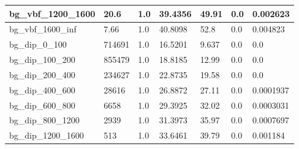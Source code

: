\documentclass[a4paper, 10pt]{article}
\begin{document}
\begin{table}[H]
\begin{center}
\begin{tabular}{|m{23.0mm}|m{23.0mm}|m{18.0mm}|m{19.0mm}|m{19.0mm}|m{19.0mm}|m{19.0mm}|}
      \hline
      {\cellcolor{white}         bg\_vbf\_1200\_1600}& {\cellcolor{white}         20.6}& {\cellcolor{white}         1.0}& {\cellcolor{white}         39.4356}& {\cellcolor{white}         49.91}& {\cellcolor{green}         0.0}& {\cellcolor{green}         0.002623}\\
      \hline
      {\cellcolor{white}         bg\_vbf\_1600\_inf}& {\cellcolor{white}         7.66}& {\cellcolor{white}         1.0}& {\cellcolor{white}         40.8098}& {\cellcolor{white}         52.8}& {\cellcolor{green}         0.0}& {\cellcolor{green}         0.004823}\\
      \hline
      {\cellcolor{white}         bg\_dip\_0\_100}& {\cellcolor{white}         714691}& {\cellcolor{white}         1.0}& {\cellcolor{white}         16.5201}& {\cellcolor{white}         9.637}& {\cellcolor{green}         0.0}& {\cellcolor{green}         0.0}\\
      \hline
      {\cellcolor{white}         bg\_dip\_100\_200}& {\cellcolor{white}         855479}& {\cellcolor{white}         1.0}& {\cellcolor{white}         18.8185}& {\cellcolor{white}         12.99}& {\cellcolor{green}         0.0}& {\cellcolor{green}         0.0}\\
      \hline
      {\cellcolor{white}         bg\_dip\_200\_400}& {\cellcolor{white}         234627}& {\cellcolor{white}         1.0}& {\cellcolor{white}         22.8735}& {\cellcolor{white}         19.58}& {\cellcolor{green}         0.0}& {\cellcolor{green}         0.0}\\
      \hline
      {\cellcolor{white}         bg\_dip\_400\_600}& {\cellcolor{white}         28616}& {\cellcolor{white}         1.0}& {\cellcolor{white}         26.8872}& {\cellcolor{white}         27.11}& {\cellcolor{green}         0.0}& {\cellcolor{green}         0.0001937}\\
      \hline
      {\cellcolor{white}         bg\_dip\_600\_800}& {\cellcolor{white}         6658}& {\cellcolor{white}         1.0}& {\cellcolor{white}         29.3925}& {\cellcolor{white}         32.02}& {\cellcolor{green}         0.0}& {\cellcolor{green}         0.0003031}\\
      \hline
      {\cellcolor{white}         bg\_dip\_800\_1200}& {\cellcolor{white}         2939}& {\cellcolor{white}         1.0}& {\cellcolor{white}         31.3973}& {\cellcolor{white}         35.97}& {\cellcolor{green}         0.0}& {\cellcolor{green}         0.0007697}\\
      \hline
      {\cellcolor{white}         bg\_dip\_1200\_1600}& {\cellcolor{white}         513}& {\cellcolor{white}         1.0}& {\cellcolor{white}         33.6461}& {\cellcolor{white}         39.79}& {\cellcolor{green}         0.0}& {\cellcolor{green}         0.001184}\\

\end{tabular}
\end{center}
\end{table}
\end{document}
